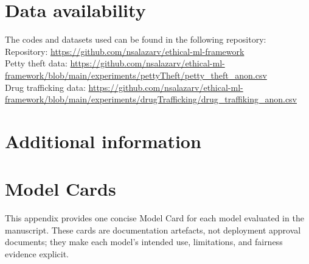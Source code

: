 \documentclass[fleqn,10pt]{wlscirep}
\begin{document}
\section*{Data availability}
The codes and datasets used can be found in the following repository: \\
Repository: \url{https://github.com/nsalazarv/ethical-ml-framework}
\\Petty theft data: \url{https://github.com/nsalazarv/ethical-ml-framework/blob/main/experiments/pettyTheft/petty_theft_anon.csv}
\\ Drug trafficking data: \url{https://github.com/nsalazarv/ethical-ml-framework/blob/main/experiments/drugTrafficking/drug_traffiking_anon.csv}

\clearpage

\section*{Additional information}

\appendix
\section{Model Cards}

This appendix provides one concise Model Card for each model evaluated in the manuscript. These cards are documentation artefacts, not deployment approval documents; they make each model's intended use, limitations, and fairness evidence explicit.
\end{document}
